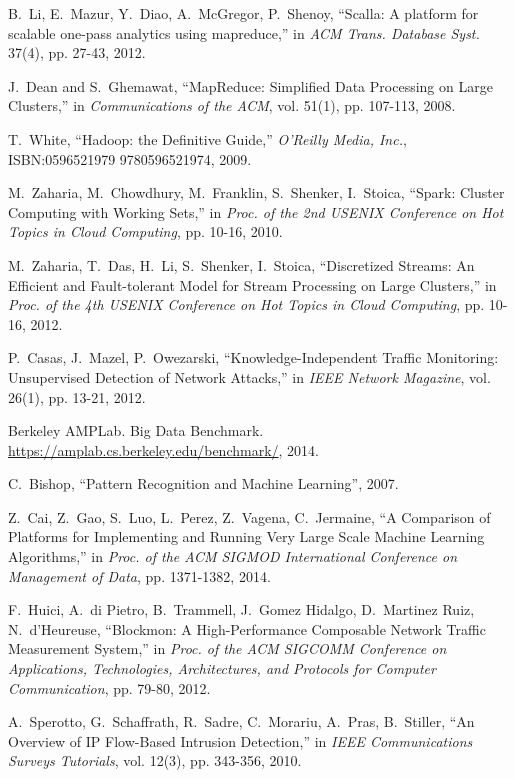 \documentclass[10pt, conference, letterpaper]{IEEEtran}
\begin{document}
\begin{thebibliography}{99}
B.~Li, E.~Mazur, Y.~Diao, A.~McGregor, P.~Shenoy, ``Scalla: A platform for scalable one-pass analytics using mapreduce,'' in \emph{ACM Trans. Database Syst.} 37(4), pp. 27-43, 2012.

J.~Dean and S.~Ghemawat, ``MapReduce: Simplified Data Processing on Large Clusters,'' in \emph{Communications of the ACM}, vol. 51(1), pp. 107-113, 2008.

T.~White, ``Hadoop: the Definitive Guide,'' \emph{O'Reilly Media, Inc.}, ISBN:0596521979 9780596521974, 2009.

M.~Zaharia, M.~Chowdhury, M.~Franklin, S.~Shenker, I.~Stoica, ``Spark: Cluster Computing with Working Sets,'' in \emph{Proc. of the 2nd USENIX Conference on Hot Topics in Cloud Computing}, pp. 10-16, 2010.

M.~Zaharia, T.~Das, H.~Li, S.~Shenker, I.~Stoica, ``Discretized Streams: An Efficient and Fault-tolerant Model for Stream Processing on Large Clusters,'' in \emph{Proc. of the 4th USENIX Conference on Hot Topics in Cloud Computing}, pp. 10-16, 2012.

P.~Casas, J.~Mazel, P.~Owezarski, ``Knowledge-Independent Traffic Monitoring: Unsupervised Detection of Network Attacks,'' in \emph{IEEE Network Magazine}, vol. 26(1), pp. 13-21, 2012.

Berkeley AMPLab. Big Data Benchmark. \url{https://amplab.cs.berkeley.edu/benchmark/}, 2014.

C.~Bishop, ``Pattern Recognition and Machine Learning'', 2007.

Z.~Cai, Z.~Gao, S.~Luo, L.~Perez, Z.~Vagena, C.~Jermaine, ``A Comparison of Platforms for Implementing and Running Very Large Scale Machine Learning Algorithms,'' in \emph{Proc. of the ACM SIGMOD International Conference on Management of Data}, pp. 1371-1382, 2014.

F.~Huici, A.~di Pietro, B.~Trammell, J.~Gomez Hidalgo, D.~Martinez Ruiz, N.~d'Heureuse, ``Blockmon: A High-Performance Composable Network Traffic Measurement System,'' in \emph{Proc. of the ACM SIGCOMM Conference on Applications, Technologies, Architectures, and Protocols for Computer Communication}, pp. 79-80, 2012.

A.~Sperotto, G.~Schaffrath, R.~Sadre, C.~Morariu, A.~Pras, B.~Stiller, ``An Overview of IP Flow-Based Intrusion Detection,'' in \emph{IEEE Communications Surveys Tutorials}, vol. 12(3), pp. 343-356, 2010.


\end{thebibliography}
\end{document}
